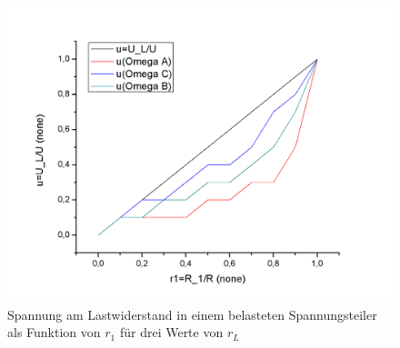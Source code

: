 \documentclass[12pt,a4paper]{article}
\begin{document}
\begin{figure}[H]
	\centering
	\includegraphics[scale=0.5]{./figure/spannungsteiler_u_r1.png}
	\caption{Spannung am Lastwiderstand in einem belasteten Spannungsteiler als Funktion von $r_1$ für drei Werte von $r_L$}
	\label{fig:spannungsteiler_lastwiderstaende}
\end{figure}
\end{document}
